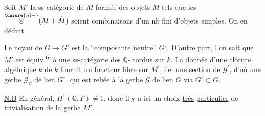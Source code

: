 Soit $M'$ la ss-catégorie de $M$ formée des objets
$M$ tels que les $\overset{\unsure{n|-}}{\otimes}(M+\check M)$ soient combinaisons d'un
nb fini  d'objets simples.  On en déduit

Le noyau de $G\to G'$ est
la ``composante neutre'' $G^\circ$.
D'autre part, l'on sait que
$M'$ est équiv.\textsuperscript{te} à une ss-catégorie  des $\mathbb Q$- tordus sur $k$. La donnée
d'une clôture algébrique $\bar k$ de $k$ fournit un
foncteur fibre sur $M^{\prime}$, i.e. une section de $\mathscr G^{\prime}$,
d'où une  gerbe
$\mathscr G_{\psi}$ de lien $G^\circ$, qui  est 
reliée à la gerbe $\mathscr G$ de lien $G$ via $G^\circ\subset G$.

\uline{N.B} En général, $H^1(\mathbb Q,\Gamma)\ne 1$, donc il y a
ici un choix \uline{très} \uline{particulier} de trivialisation de
\uline{la gerbe $M'$}.

